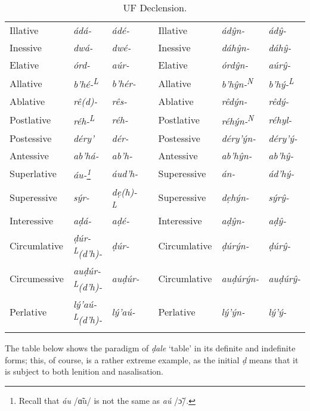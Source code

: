 \documentclass[a4paper, 12pt, twoside, openright, final]{book}
\def \L {\textsuperscript{L}}
\def \N {\textsuperscript{N}}
\let \w \textit
\begin{document}
\begin{longtable}{l|>{\it}l|>{\it}lll|>{\it}l|>{\it}l}
Illative      & ádá-           & ádé-     && Illative      & ádŷn-        & ádŷ-     \\
Inessive      & dwá-           & dwé-     && Inessive      & dáhŷn-       & dáhŷ-    \\
Elative       & órd-           & aúr-     && Elative       & órdŷn-       & aúrŷ-    \\
Allative      & b’hé-\L        & b’hér-   && Allative      & b’hŷn-\N     & b’hý-\L  \\
Ablative      & rê(d)-         & rês-     && Ablative      & rêdýn-       & rêdý-    \\
Postlative    & réh-\L         & réh-     && Postlative    & réhýn-\N     & réhyl-   \\ %
Postessive    & déry’          & dér-     && Postessive    & déry’ýn-     & déry’ý-  \\
Antessive     & ab’há-         & ab’h-    && Antessive     & ab’hŷn-      & ab’hŷ-   \\ %
Superlative   & áu-\footnote{Recall that \w{áu} /ɑ̃u/ is not the same as \w{aú} /ɔ̃/.}
              & áud’h-   && Superessive   & án-          & ád’hý-   \\ %
Superessive   & sýr-           & dẹ(h)-\L && Superessive   & dẹhýn-       & sýrŷ-    \\
Interessive   & aḍá-           & aḍé-     && Interessive   & aḍŷn-        & aḍŷ-     \\
Circumlative  & ḍúr-\L(d’h)-   & ḍúr-     && Circumlative  & ḍúrýn-       & ḍúrŷ-    \\ %
Circumessive  & auḍúr-\L(d’h)- & auḍúr-   && Circumlative  & auḍúrýn-     & auḍúrŷ-  \\ %
Perlative     & lý’aú-\L(d’h)- & lý’aú-   && Perlative     & lý’ýn-       & lý’ý-    \\ %
\noalign{\medskip}
\caption{UF Declension.}\label{tab:table-uf-declension}
\end{longtable}

\noindent The table below shows the paradigm of \w{ḍale} ‘table’ in its definite and indefinite forms; this, of course,
is a rather extreme example, as the initial \w{ḍ} means that it is subject to both lenition and nasalisation.
\end{document}
